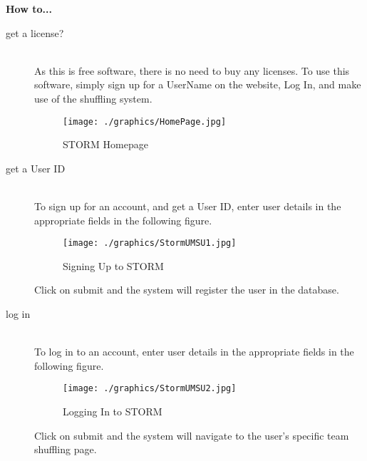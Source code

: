 {\Large \textbf{How to...} \par}

\begin{description}
 	\item[get a license?] \hfill \\
 		As this is free software, there is no need to buy any licenses. To use this software, simply 
		sign up for a UserName on the website, Log In, and make use of the shuffling system.
 		\begin{figure}[H] 
		 	\centering
			 \texttt{[image: ./graphics/HomePage.jpg]}
			 \caption{STORM Homepage}
		 \end{figure}
 	\item[get a User ID] \hfill \\
		To sign up for an account, and get a User ID, enter user details in the appropriate fields in the 		following figure.\par
		 \begin{figure}[H] 
		 \centering
		 \texttt{[image: ./graphics/StormUMSU1.jpg]}
		 \caption{Signing Up to STORM}
		 \end{figure}
   		Click on submit and the system will register the user in the database.
	\item[log in] \hfill \\
 		To log in to an account, enter user details in the appropriate fields in the following figure.\par
   		\begin{figure}[H] 
		\centering 
		\texttt{[image: ./graphics/StormUMSU2.jpg]}
		\caption{Logging In to STORM}
		\end{figure}
   		Click on submit and the system will navigate to the user's specific team shuffling page.
				
\end{description}